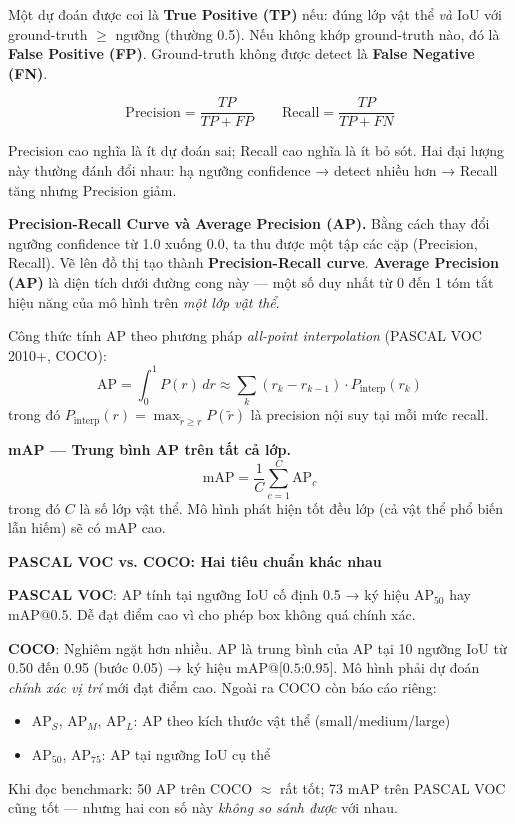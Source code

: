 Một dự đoán được coi là \textbf{True Positive (TP)} nếu: đúng lớp vật thể \textit{và} IoU với ground-truth $\geq$ ngưỡng (thường 0.5). Nếu không khớp ground-truth nào, đó là \textbf{False Positive (FP)}. Ground-truth không được detect là \textbf{False Negative (FN)}.

\[
\text{Precision} = \frac{TP}{TP + FP} \qquad \text{Recall} = \frac{TP}{TP + FN}
\]

Precision cao nghĩa là ít dự đoán sai; Recall cao nghĩa là ít bỏ sót. Hai đại lượng này thường đánh đổi nhau: hạ ngưỡng confidence → detect nhiều hơn → Recall tăng nhưng Precision giảm.

\textbf{Precision-Recall Curve và Average Precision (AP).}
Bằng cách thay đổi ngưỡng confidence từ 1.0 xuống 0.0, ta thu được một tập các cặp (Precision, Recall). Vẽ lên đồ thị tạo thành \textbf{Precision-Recall curve}. \textbf{Average Precision (AP)} là diện tích dưới đường cong này --- một số duy nhất từ 0 đến 1 tóm tắt hiệu năng của mô hình trên \textit{một lớp vật thể}.

Công thức tính AP theo phương pháp \textit{all-point interpolation} (PASCAL VOC 2010+, COCO):
\[
\text{AP} = \int_0^1 P(r)\, dr \approx \sum_{k} \left( r_k - r_{k-1} \right) \cdot P_{\text{interp}}(r_k)
\]
trong đó $P_{\text{interp}}(r) = \max_{\tilde{r} \geq r} P(\tilde{r})$ là precision nội suy tại mỗi mức recall.

\textbf{mAP --- Trung bình AP trên tất cả lớp.}
\[
\text{mAP} = \frac{1}{C} \sum_{c=1}^{C} \text{AP}_c
\]
trong đó $C$ là số lớp vật thể. Mô hình phát hiện tốt đều lớp (cả vật thể phổ biến lẫn hiếm) sẽ có mAP cao.

\begin{mdframed}[style=infobox]
\textbf{PASCAL VOC vs. COCO: Hai tiêu chuẩn khác nhau}

\textbf{PASCAL VOC}: AP tính tại ngưỡng IoU cố định 0.5 → ký hiệu $\text{AP}_{50}$ hay $\text{mAP@0.5}$. Dễ đạt điểm cao vì cho phép box không quá chính xác.

\textbf{COCO}: Nghiêm ngặt hơn nhiều. $\text{AP}$ là trung bình của AP tại 10 ngưỡng IoU từ 0.50 đến 0.95 (bước 0.05) → ký hiệu $\text{mAP@[0.5:0.95]}$. Mô hình phải dự đoán \textit{chính xác vị trí} mới đạt điểm cao. Ngoài ra COCO còn báo cáo riêng:
\begin{itemize}
    \item $\text{AP}_S$, $\text{AP}_M$, $\text{AP}_L$: AP theo kích thước vật thể (small/medium/large)
    \item $\text{AP}_{50}$, $\text{AP}_{75}$: AP tại ngưỡng IoU cụ thể
\end{itemize}

Khi đọc benchmark: 50 AP trên COCO $\approx$ rất tốt; 73 mAP trên PASCAL VOC cũng tốt --- nhưng hai con số này \textit{không so sánh được} với nhau.
\end{mdframed}


